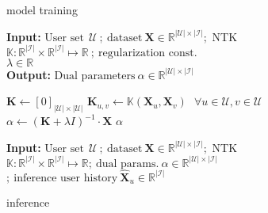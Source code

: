\documentclass{article}
\begin{document}
\begin{figure*}[h] \centering
\begin{minipage}{0.49\textwidth}
    \centering
    \vspace{-0.5cm}
\begin{algorithm}[H]
\centering
\caption{\model model training} \label{alg:inf_ae_trian}
    \begin{flushleft}
        \textbf{Input:} $\text{User set}~~ \mathcal{U} ~;~ \text{dataset}~ \mathbf{X} \in \mathbb{R}^{|\mathcal{U}| \times |\mathcal{I}|} ;$ NTK \\
        $\mathbb{K} : \mathbb{R}^{|\mathcal{I}|} \times \mathbb{R}^{|\mathcal{I}|} \mapsto \mathbb{R} ~;~ \text{regularization const.}$ \\ $\lambda \in \mathbb{R}$ \\
        \textbf{Output:} $\text{Dual parameters}~ \alpha \in \mathbb{R}^{|\mathcal{U}| \times |\mathcal{I}|}$
    \end{flushleft}
    \vspace{0.1cm}
    \begin{algorithmic}[1]
            \State $\mathbf{K} \leftarrow [ 0 ]_{|\mathcal{U}| \times |\mathcal{U}|}$ 
\State $\mathbf{K}_{u, v} \leftarrow \mathbb{K}(\mathbf{X}_u, \mathbf{X}_v) ~~~ \forall u \in \mathcal{U}, v \in \mathcal{U}$
\State $\alpha \leftarrow (\mathbf{K} + \lambda I)^{-1} \cdot \mathbf{X}$
            \State \Return $\alpha$
        \EndProcedure
    \end{algorithmic}
    \vspace{0.08cm}
\end{algorithm} \end{minipage} \hfill
\begin{minipage}{0.49\textwidth}
    \centering
    \vspace{-0.5cm}
\begin{algorithm}[H]
\centering
\caption{\model inference} \label{alg:inf_ae_predict}
    \begin{flushleft}
        \textbf{Input:} $\text{User set}~~ \mathcal{U} ~;~ \text{dataset}~ \mathbf{X} \in \mathbb{R}^{|\mathcal{U}| \times |\mathcal{I}|} ;$ NTK \\
        $\mathbb{K} : \mathbb{R}^{|\mathcal{I}|} \times \mathbb{R}^{|\mathcal{I}|} \mapsto \mathbb{R} ;~ \text{dual params.}~ \alpha \in \mathbb{R}^{|\mathcal{U}| \times |\mathcal{I}|}$ \\
        $;~ \text{inference user history}~ \hat{\mathbf{X}}_u \in \mathbb{R}^{|\mathcal{I}|} $ \\

\end{flushleft}
\end{algorithm}
\end{minipage}
\end{figure*}
\end{document}
